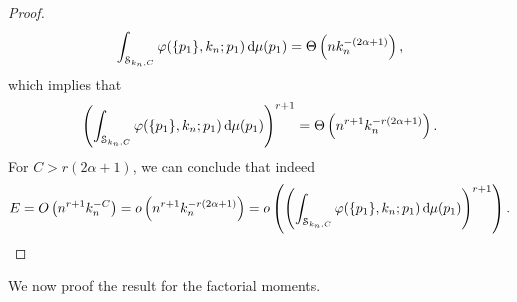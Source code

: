 \begin{proof}
\begin{align*}
\int_{\mathcal{S}_{k_n,C}} \varphi(\{p_1\}, k_n ;p_1) \operatorname{\mathrm{d}\hspace{-2pt}} \mu(p_1) = \Theta\left(n k_n^{-(2\alpha+1)}\right),
\end{align*}
which implies that
\begin{align*}
\left(\int_{\mathcal{S}_{k_n,C}} \varphi(\{p_1\}, k_n ;p_1) \operatorname{\mathrm{d}\hspace{-2pt}} \mu(p_1) \right)^{r+1} 
= \Theta\left(n^{r+1}k_n^{-r(2\alpha+1)}\right).
\end{align*}
For $C>r(2\alpha+1)$, we can conclude that indeed
\begin{align*}
E = O\left(n^{r+1}k_n^{-C}\right)=o\left(n^{r+1}k_n^{-r(2\alpha+1)}\right)=o\left(\left(\int_{\mathcal{S}_{k_n,C}} \varphi(\{p_1\}, k_n ;p_1) \operatorname{\mathrm{d}\hspace{-2pt}} \mu(p_1)\right)^{r+1}\right).
\end{align*}
\end{proof}

We now proof the result for the factorial moments.


